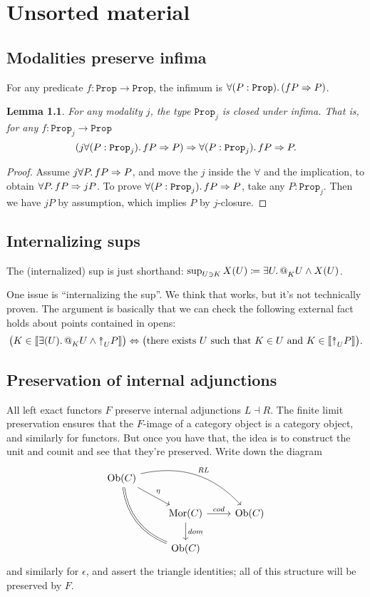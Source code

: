 \documentclass[11pt, oneside, article]{memoir}
\makeatletter
\theoremstyle{plain}
\newtheorem{lemma}[theorem]{Lemma}
\theoremstyle{definition}
\theoremstyle{remark}
\DeclarePairedDelimiter{\church}{\llbracket}{\rrbracket}
\DeclareMathOperator{\Mor}{Mor}
\DeclareMathOperator{\Ob}{Ob}
\newcommand{\const}[1]{\mathtt{#1}}
\newcommand{\Prop}{\const{Prop}}
\newcommand{\AtSymbol}{{@}}
\newcommand{\InSymbol}{{\upclose}}%
\newcommand{\At}[2][]{\AtSymbol^{#1}_{#2}}
\newcommand{\In}[2][]{\InSymbol^{#1}_{#2}}
\newcommand{\upclose}{{\rotatebox[origin=c]{90}{$\twoheadrightarrow$}}}
\newcommand{\imp}{\Rightarrow}
\renewcommand{\iff}{\Leftrightarrow}
\makeatother
\begin{document}
\appendix

\chapter{Unsorted material}

\section{Modalities preserve infima}

For any predicate $f:\Prop\to\Prop$, the infimum is $\forall(P:\Prop)\ldotp(fP\imp P)$.

\begin{lemma}
For any modality $j$, the type $\Prop_j$ is closed under infima. That is, for any $f:\Prop_j\to\Prop$
\[(j\forall(P:\Prop_j)\ldotp fP\imp P)\imp\forall(P:\Prop_j)\ldotp fP\imp P.\]
\end{lemma}
\begin{proof}
Assume $j\forall P\ldotp fP\imp P$, and move the $j$ inside the $\forall$ and the implication, to obtain $\forall P\ldotp fP\imp jP$. To prove $\forall(P:\Prop_j)\ldotp fP\imp P$, take any $P:\Prop_j$. Then we have $jP$ by assumption, which implies $P$ by $j$-closure.
\end{proof}

\section{Internalizing sups}
 
The (internalized) sup is just shorthand: $\sup_{U\ni K}X(U)\coloneqq \exists U\ldotp \At{K}U\wedge X(U)$.

One issue is ``internalizing the sup''. We think that works, but it's not technically proven. The argument is basically that we can check the following external fact holds about points contained in opens:
\[\big(K\in\church{\exists(U)\ldotp\At{K}U\wedge\In{U}P}\big)\iff\big(\text{there exists $U$ such that $K\in U$ and }K\in\church{\In{U}P}\big).\]

\section{Preservation of internal adjunctions}

All left exact functors $F$ preserve internal adjunctions $L\dashv R$. The finite limit preservation ensures that the $F$-image of a category object is a category object, and similarly for functors. But once you have that, the idea is to construct the unit and counit and see that they're preserved. Write down the diagram
\[
\begin{tikzcd}
	\Ob(C)\ar[drr, bend left, "RL"]\ar[ddr, bend right, equal]\ar[dr, "\eta"]\\
	&\Mor(C)\ar[r, "cod"]\ar[d, "dom"]&\Ob(C)\\
	&\Ob(C)
\end{tikzcd}
\]
and similarly for $\epsilon$, and assert the triangle identities; all of this structure will be preserved by $F$.
\end{document}

